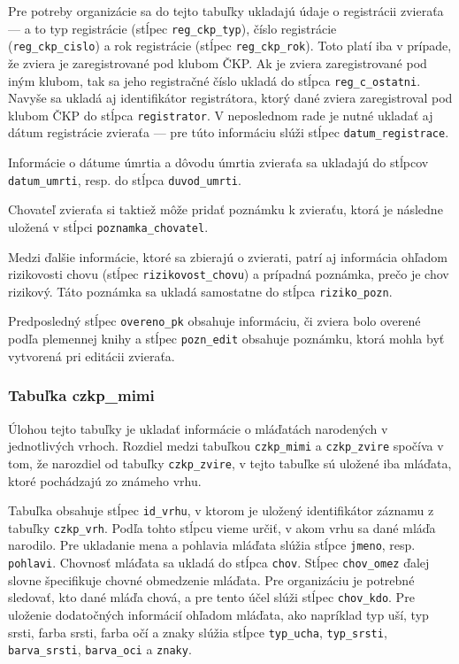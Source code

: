 Pre potreby organizácie sa do tejto tabuľky ukladajú údaje o registrácii zvieraťa ---  a to typ registrácie (stĺpec \texttt{reg_ckp_typ}), číslo registrácie\\ (\texttt{reg_ckp_cislo}) a rok registrácie (stĺpec \texttt{reg_ckp_rok}). Toto platí iba v prípade, že zviera je zaregistrované pod klubom ČKP. Ak je zviera zaregistrované pod iným klubom, tak sa jeho registračné číslo ukladá do stĺpca \texttt{reg_c_ostatni}. Navyše sa ukladá aj identifikátor registrátora, ktorý dané zviera zaregistroval pod klubom ČKP do stĺpca \texttt{registrator}. V neposlednom rade je nutné ukladať aj dátum registrácie zvieraťa --- pre túto informáciu slúži stĺpec \texttt{datum_registrace}.

Informácie o dátume úmrtia a dôvodu úmrtia zvieraťa sa ukladajú do stĺpcov \texttt{datum_umrti}, resp. do stĺpca \texttt{duvod_umrti}.

Chovateľ zvieraťa si taktiež môže pridať poznámku k zvieraťu, ktorá je následne uložená v stĺpci \texttt{poznamka_chovatel}.

Medzi ďalšie informácie, ktoré sa zbierajú o zvierati, patrí aj informácia ohľadom rizikovosti chovu (stĺpec \texttt{rizikovost_chovu}) a prípadná poznámka, prečo je chov rizikový. Táto poznámka sa ukladá samostatne do stĺpca \texttt{riziko_pozn}.

Predposledný stĺpec \texttt{overeno_pk} obsahuje informáciu, či zviera bolo overené podľa plemennej knihy a stĺpec \texttt{pozn_edit} obsahuje poznámku, ktorá mohla byť vytvorená pri editácii zvieraťa.

\subsubsection*{Tabuľka czkp\_mimi}

Úlohou tejto tabuľky je ukladať informácie o mláďatách narodených v jednotlivých vrhoch.
Rozdiel medzi tabuľkou \texttt{czkp_mimi} a \texttt{czkp_zvire} spočíva v tom, že narozdiel od tabuľky \texttt{czkp_zvire}, v tejto tabuľke sú uložené iba mláďata, ktoré pochádzajú zo známeho vrhu.

Tabuľka obsahuje stĺpec \texttt{id_vrhu}, v ktorom je uložený identifikátor záznamu z tabuľky \texttt{czkp_vrh}. Podľa tohto stĺpcu vieme určiť, v akom vrhu sa dané mláďa narodilo. Pre ukladanie mena a pohlavia mláďata slúžia stĺpce \texttt{jmeno}, resp. \texttt{pohlavi}. Chovnosť mláďata sa ukladá do stĺpca \texttt{chov}. Stĺpec \texttt{chov_omez} ďalej slovne špecifikuje chovné obmedzenie mláďata. Pre organizáciu je potrebné sledovať, kto dané mláďa chová, a pre tento účel slúži stĺpec \texttt{chov_kdo}. Pre uloženie dodatočných informácií ohľadom mláďata, ako napríklad typ uší, typ srsti, farba srsti, farba očí a znaky slúžia stĺpce \texttt{typ_ucha}, \texttt{typ_srsti}, \texttt{barva_srsti}, \texttt{barva_oci} a \texttt{znaky}.

